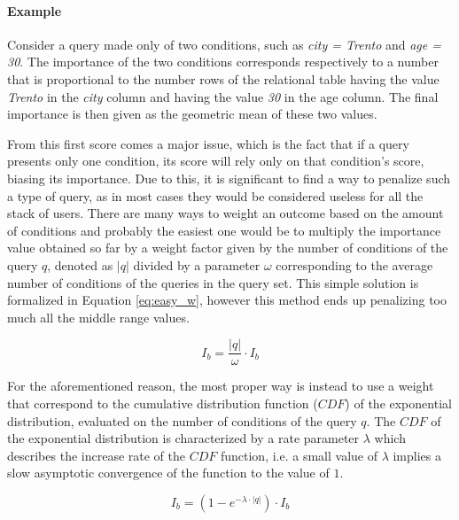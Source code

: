 

\paragraph{Example} Consider a query made only of two conditions, such as \emph{city = Trento} and \emph{age = 30}. The importance of the two conditions corresponds respectively to a number that is proportional to the number rows of the relational table having the value \emph{Trento} in the \emph{city} column and having the value \emph{30} in the age column. The final  importance is then given as the geometric mean of these two values.

\vspace{1em}

From this first score comes a major issue, which is the fact that if a query presents only one condition, its score will rely only on that condition's score, biasing its importance. Due to this, it is significant to find a way to penalize such a type of query, as in most cases they would be considered useless for all the stack of users.
There are many ways to weight an outcome based on the amount of conditions and probably the easiest one would be to multiply the importance value obtained so far by a weight factor given  by the number of conditions of the query $q$, denoted as $|q|$ divided by a parameter $\omega$ corresponding to the average number of conditions of the queries in the query set. This simple solution is formalized in Equation \ref{eq:easy_w}, however this method ends up penalizing too much all the middle range values.

\begin{equation}\label{eq:easy_w}
  I_b =  \frac{|q|}{\omega} \cdot I_b 
\end{equation}

For the aforementioned reason, the most proper way is instead to use a weight that correspond to the cumulative distribution function ($CDF$) of the exponential distribution, evaluated on the number of conditions of the query $q$. The $CDF$ of the exponential distribution is characterized by a rate parameter $\lambda$ which describes the increase rate of the $CDF$ function, i.e. a small value of $\lambda$ implies a slow asymptotic convergence of the function to the value of $1$.

\begin{equation}\label{eq:CDF_w}
    I_b = \left( 1 - e^{-\lambda \cdot \lvert q \lvert} \right) \cdot I_b 
\end{equation}


